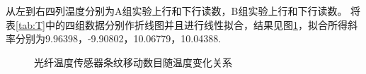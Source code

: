 \documentclass[10pt,a4paper,twoside,UTF8]{ctexart}
\begin{document}
从左到右四列温度分别为A组实验上行和下行读数，B组实验上行和下行读数。
将表\ref{tab:T}中的四组数据分别作折线图并且进行线性拟合，结果见图\ref{fig:T}，拟合所得斜率分别为9.96398，-9.90802，10.06779，10.04388.

  \begin{figure}[htbp]
	\centering

	\caption{光纤温度传感器条纹移动数目随温度变化关系}
	\label{fig:T}
\end{figure}
\end{document}
